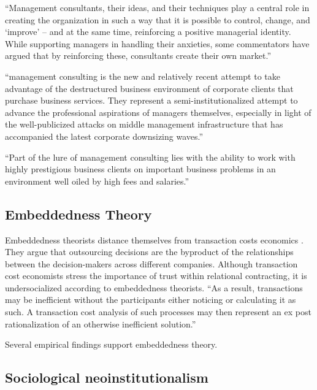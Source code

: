 \documentclass[12pt]{article}
\begin{document}
``Management consultants, their ideas, and their techniques play a
central role in creating the organization in such a way that it is
possible to control, change, and `improve' -- and at the same time,
reinforcing a positive managerial identity. While supporting managers in
handling their anxieties, some commentators have argued that by
reinforcing these, consultants create their own market.'' \citep[
48]{werr2002}

``management consulting is the new and relatively recent attempt to take
advantage of the destructured business environment of corporate clients
that purchase business services. They represent a semi-institutionalized
attempt to advance the professional aspirations of managers themselves,
especially in light of the well-publicized attacks on middle management
infrastructure that has accompanied the latest corporate downsizing
waves.'' \citep[ 35]{leicht2006}

``Part of the lure of management consulting lies with the ability to
work with highly prestigious business clients on important business
problems in an environment well oiled by high fees and salaries.''
\citep[ 37]{leicht2006}

\hypertarget{embeddedness-theory}{%
\subsection{Embeddedness Theory}\label{embeddedness-theory}}

Embeddedness theorists distance themselves from transaction costs
economics \citep[ 14-16]{armbruster2006}. They argue that outsourcing
decisions are the byproduct of the relationships between the
decision-makers across different companies. Although transaction cost
economists stress the importance of trust within relational contracting,
it is undersocialized according to embeddedness theorists. ``As a
result, transactions may be inefficient without the participants either
noticing or calculating it as such. A transaction cost analysis of such
processes may then represent an ex post rationalization of an otherwise
inefficient solution.'' \citep[ 15]{armbruster2006}

Several empirical findings support embeddedness theory.

\hypertarget{sociological-neoinstitutionalism}{%
\subsection{Sociological
neoinstitutionalism}\label{sociological-neoinstitutionalism}}
\end{document}
